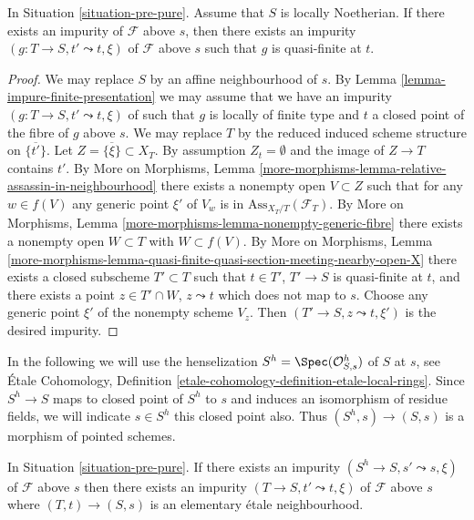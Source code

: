 \begin{lemma}
\label{lemma-Noetherian-impurity-quasi-finite}
In Situation \ref{situation-pre-pure}.
Assume that $S$ is locally Noetherian.
If there exists an impurity of $\mathcal{F}$ above $s$, then
there exists an impurity $(g : T \to S, t' \leadsto t, \xi)$
of $\mathcal{F}$ above $s$ such that $g$ is quasi-finite at $t$.
\end{lemma}

\begin{proof}
We may replace $S$ by an affine neighbourhood of $s$. By
Lemma \ref{lemma-impure-finite-presentation}
we may assume that we have an impurity $(g : T \to S, t' \leadsto t, \xi)$
of such that $g$ is locally of finite type and $t$ a closed point of the
fibre of $g$ above $s$. We may replace $T$ by the reduced induced
scheme structure on $\overline{\{t'\}}$. Let
$Z = \overline{\{\xi\}} \subset X_T$. By assumption $Z_t = \emptyset$
and the image of $Z \to T$ contains $t'$. By
More on Morphisms,
Lemma \ref{more-morphisms-lemma-relative-assassin-in-neighbourhood}
there exists a nonempty open $V \subset Z$ such that for any
$w \in f(V)$ any generic point $\xi'$ of $V_w$ is in
$\text{Ass}_{X_T/T}(\mathcal{F}_T)$. By
More on Morphisms, Lemma \ref{more-morphisms-lemma-nonempty-generic-fibre}
there exists a nonempty open $W \subset T$ with $W \subset f(V)$. By
More on Morphisms, Lemma
\ref{more-morphisms-lemma-quasi-finite-quasi-section-meeting-nearby-open-X}
there exists a closed subscheme $T' \subset T$ such that
$t \in T'$, $T' \to S$ is quasi-finite at $t$, and there exists a point
$z \in T' \cap W$, $z \leadsto t$ which does not map to $s$.
Choose any generic point $\xi'$ of the nonempty scheme $V_z$.
Then $(T' \to S, z \leadsto t, \xi')$ is the desired impurity.
\end{proof}

\noindent
In the following we will use the henselization
$S^h = \Spec(\mathcal{O}_{S, s}^h)$
of $S$ at $s$, see
\'Etale Cohomology,
Definition \ref{etale-cohomology-definition-etale-local-rings}.
Since $S^h \to S$ maps to closed point of $S^h$ to $s$ and
induces an isomorphism of residue fields, we will indicate
$s \in S^h$ this closed point also. Thus $(S^h, s) \to (S, s)$ is
a morphism of pointed schemes.

\begin{lemma}
\label{lemma-impurity-on-henselization}
In Situation \ref{situation-pre-pure}.
If there exists an impurity $(S^h \to S, s' \leadsto s, \xi)$
of $\mathcal{F}$ above $s$ then there exists an impurity
$(T \to S, t' \leadsto t, \xi)$ of $\mathcal{F}$ above $s$
where $(T, t) \to (S, s)$ is an elementary \'etale neighbourhood.
\end{lemma}


